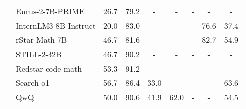 \begin{table*}[htbp]
{\begin{tabular}{l|lccccccc}

\hline

\fontsize{7}{10}\selectfont\multirow{14}{*}{\rotatebox{90}{\textbf{Reasoning LLMs}}} & \cellcolor[rgb]{ .949,  .949,  .949}Eurus-2-7B-PRIME \cite{cui2025process} & \cellcolor[rgb]{ .949,  .949,  .949}26.7 & \cellcolor[rgb]{ .949,  .949,  .949}79.2 & \cellcolor[rgb]{ .949,  .949,  .949}- & \cellcolor[rgb]{ .949,  .949,  .949}- &\cellcolor[rgb]{ .949,  .949,  .949} - & \cellcolor[rgb]{ .949,  .949,  .949}- & \cellcolor[rgb]{ .949,  .949,  .949}-  \\

& InternLM3-8B-Instruct \cite{cai2024internlm2} & 20.0 & 83.0 & - & - & - & 76.6 & 37.4 \\

& \cellcolor[rgb]{ .949,  .949,  .949}rStar-Math-7B \cite{guan2025rstarmathsmallllmsmaster} & \cellcolor[rgb]{ .949,  .949,  .949}46.7 & \cellcolor[rgb]{ .949,  .949,  .949}81.6 &\cellcolor[rgb]{ .949,  .949,  .949} - & \cellcolor[rgb]{ .949,  .949,  .949}- & \cellcolor[rgb]{ .949,  .949,  .949}- & \cellcolor[rgb]{ .949,  .949,  .949}82.7 & \cellcolor[rgb]{ .949,  .949,  .949}54.9 \\

  & STILL-2-32B \cite{Slow_Thinking_with_LLMs_2}& 46.7 & 90.2 & - & - &- & - & - \\
  
    & \cellcolor[rgb]{ .949,  .949,  .949}Redstar-code-math \cite{RedStar} & \cellcolor[rgb]{ .949,  .949,  .949}53.3 & \cellcolor[rgb]{ .949,  .949,  .949}91.2 &\cellcolor[rgb]{ .949,  .949,  .949} - &\cellcolor[rgb]{ .949,  .949,  .949} - &\cellcolor[rgb]{ .949,  .949,  .949} - &\cellcolor[rgb]{ .949,  .949,  .949} - &\cellcolor[rgb]{ .949,  .949,  .949} -  \\
    
 & Search-o1 \cite{li2025search}& 56.7 & 86.4 & 33.0 & - &- & - &63.6 \\
 
 & \cellcolor[rgb]{ .949,  .949,  .949}QwQ \cite{qwq-32b-preview} & \cellcolor[rgb]{ .949,  .949,  .949}50.0 & \cellcolor[rgb]{ .949,  .949,  .949}90.6 & \cellcolor[rgb]{ .949,  .949,  .949}41.9 & \cellcolor[rgb]{ .949,  .949,  .949}62.0 & \cellcolor[rgb]{ .949,  .949,  .949}- &\cellcolor[rgb]{ .949,  .949,  .949} - & \cellcolor[rgb]{ .949,  .949,  .949}54.5 \\
 

\end{tabular}}
\end{table*}

